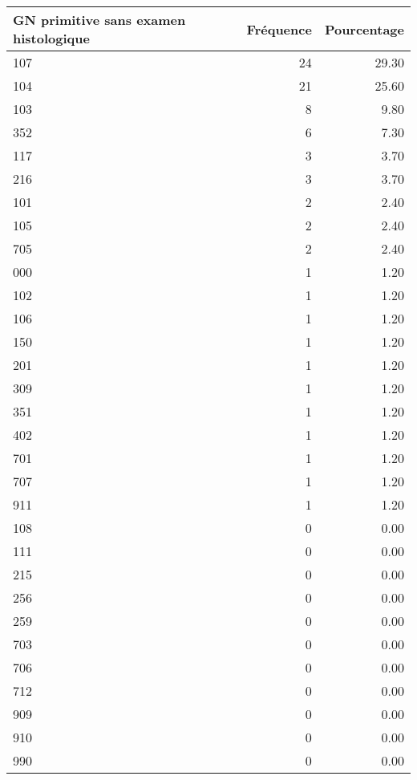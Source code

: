 \documentclass[11pt,a4paper]{article}\usepackage[]{graphicx}\usepackage[]{color}
\begin{document}
\begin{table}[H]
\centering
\begin{tabular}{lrr}
  \hline
GN primitive sans examen histologique & Fréquence & Pourcentage \\ 
  \hline
107 &  24 & 29.30 \\ 
  104 &  21 & 25.60 \\ 
  103 &   8 & 9.80 \\ 
  352 &   6 & 7.30 \\ 
  117 &   3 & 3.70 \\ 
  216 &   3 & 3.70 \\ 
  101 &   2 & 2.40 \\ 
  105 &   2 & 2.40 \\ 
  705 &   2 & 2.40 \\ 
  000 &   1 & 1.20 \\ 
  102 &   1 & 1.20 \\ 
  106 &   1 & 1.20 \\ 
  150 &   1 & 1.20 \\ 
  201 &   1 & 1.20 \\ 
  309 &   1 & 1.20 \\ 
  351 &   1 & 1.20 \\ 
  402 &   1 & 1.20 \\ 
  701 &   1 & 1.20 \\ 
  707 &   1 & 1.20 \\ 
  911 &   1 & 1.20 \\ 
  108 &   0 & 0.00 \\ 
  111 &   0 & 0.00 \\ 
  215 &   0 & 0.00 \\ 
  256 &   0 & 0.00 \\ 
  259 &   0 & 0.00 \\ 
  703 &   0 & 0.00 \\ 
  706 &   0 & 0.00 \\ 
  712 &   0 & 0.00 \\ 
  909 &   0 & 0.00 \\ 
  910 &   0 & 0.00 \\ 
  990 &   0 & 0.00 \\ 
   \hline
\end{tabular}
\end{table}
\end{document}
